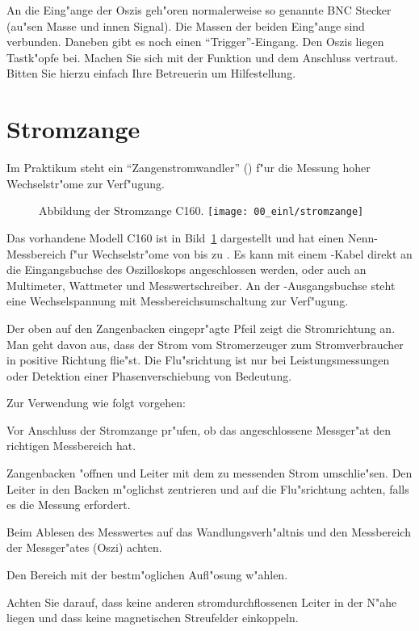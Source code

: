 An die Eing"ange der Oszis geh"oren normalerweise so genannte BNC
Stecker (au"sen Masse und innen Signal). Die Massen der beiden
Eing"ange sind verbunden. Daneben gibt es noch einen
"`Trigger"'-Eingang. Den Oszis liegen Tastk"opfe bei.
Machen Sie sich mit der Funktion und dem Anschluss vertraut. Bitten
Sie hierzu einfach Ihre Betreuerin um Hilfestellung.


\section{Stromzange}

Im Praktikum steht ein "`Zangenstromwandler"'
() f"ur die Messung hoher
Wechselstr"ome zur Verf"ugung.
%
\begin{figure}[htb]
 \begin{captionbeside}{\label{a:stromzange}Abbildung der Stromzange C160.}
  \texttt{[image: 00\_einl/stromzange]}
 \end{captionbeside}
\end{figure}
%
Das vorhandene Modell C160 ist in Bild~\ref{a:stromzange}
dargestellt und hat einen Nenn-Messbereich f"ur Wechselstr"ome von
 bis zu . Es kann mit einem
-Kabel direkt an die Eingangsbuchse des Oszilloskops
angeschlossen werden, oder auch an Multimeter, Wattmeter und
Messwertschreiber. An der -Ausgangsbuchse steht eine
Wechselspannung mit Messbereichsumschaltung zur Verf"ugung.

Der oben auf den Zangenbacken eingepr"agte Pfeil zeigt die
Stromrichtung an. Man geht davon aus, dass der Strom vom
Stromerzeuger zum Stromverbraucher in positive Richtung flie"st.
Die Flu"srichtung ist nur bei Leistungsmessungen oder Detektion
einer Phasenverschiebung von Bedeutung.

Zur Verwendung wie folgt vorgehen:
\begin{enumerate*}
    \item Vor Anschluss der Stromzange pr"ufen, ob das
    angeschlossene Messger"at den richtigen Messbereich hat.
    \item Zangenbacken "offnen und Leiter mit dem zu messenden
    Strom umschlie"sen. Den Leiter in den Backen m"oglichst
    zentrieren und auf die Flu"srichtung achten, falls es die
    Messung erfordert.
    \item Beim Ablesen des Messwertes auf das Wandlungsverh"altnis
    und den Messbereich der Messger"ates (Oszi) achten.
    \item Den Bereich mit der bestm"oglichen Aufl"osung w"ahlen.
    \item Achten Sie darauf, dass keine anderen
    stromdurchflossenen Leiter in der N"ahe liegen und dass keine
    magnetischen Streufelder einkoppeln.
\end{enumerate*}


